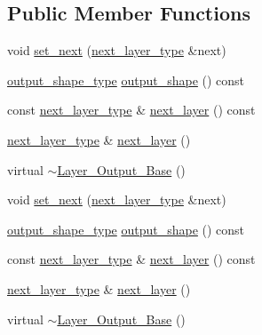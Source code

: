 \subsection*{Public Member Functions}
\begin{DoxyCompactItemize}
\item 
void \hyperlink{structbc_1_1nn_1_1Layer__Output__Base_a5a8d62346446d12d82153844b051e555}{set\+\_\+next} (\hyperlink{structbc_1_1nn_1_1Layer__Output__Base_a0c791bc57bcc78e8d82e8a5375f1c584}{next\+\_\+layer\+\_\+type} \&next)
\item 
\hyperlink{structbc_1_1nn_1_1Layer__Output__Base_aa627047014ee5dff2b9cc1804c791815}{output\+\_\+shape\+\_\+type} \hyperlink{structbc_1_1nn_1_1Layer__Output__Base_a68e2547ad75da9ef3a3410a9aec85a5e}{output\+\_\+shape} () const
\item 
const \hyperlink{structbc_1_1nn_1_1Layer__Output__Base_a0c791bc57bcc78e8d82e8a5375f1c584}{next\+\_\+layer\+\_\+type} \& \hyperlink{structbc_1_1nn_1_1Layer__Output__Base_a5f43dd4ad641db100b847d33843ef837}{next\+\_\+layer} () const
\item 
\hyperlink{structbc_1_1nn_1_1Layer__Output__Base_a0c791bc57bcc78e8d82e8a5375f1c584}{next\+\_\+layer\+\_\+type} \& \hyperlink{structbc_1_1nn_1_1Layer__Output__Base_a38b80aba3c1821fbef1f5525e282c36d}{next\+\_\+layer} ()
\item 
virtual \hyperlink{structbc_1_1nn_1_1Layer__Output__Base_a4ac27a579c01108c3ed2a7a95010382b}{$\sim$\+Layer\+\_\+\+Output\+\_\+\+Base} ()
\item 
void \hyperlink{structbc_1_1nn_1_1Layer__Output__Base_a5a8d62346446d12d82153844b051e555}{set\+\_\+next} (\hyperlink{structbc_1_1nn_1_1Layer__Output__Base_a0c791bc57bcc78e8d82e8a5375f1c584}{next\+\_\+layer\+\_\+type} \&next)
\item 
\hyperlink{structbc_1_1nn_1_1Layer__Output__Base_aa627047014ee5dff2b9cc1804c791815}{output\+\_\+shape\+\_\+type} \hyperlink{structbc_1_1nn_1_1Layer__Output__Base_a68e2547ad75da9ef3a3410a9aec85a5e}{output\+\_\+shape} () const
\item 
const \hyperlink{structbc_1_1nn_1_1Layer__Output__Base_a0c791bc57bcc78e8d82e8a5375f1c584}{next\+\_\+layer\+\_\+type} \& \hyperlink{structbc_1_1nn_1_1Layer__Output__Base_a5f43dd4ad641db100b847d33843ef837}{next\+\_\+layer} () const
\item 
\hyperlink{structbc_1_1nn_1_1Layer__Output__Base_a0c791bc57bcc78e8d82e8a5375f1c584}{next\+\_\+layer\+\_\+type} \& \hyperlink{structbc_1_1nn_1_1Layer__Output__Base_a38b80aba3c1821fbef1f5525e282c36d}{next\+\_\+layer} ()
\item 
virtual \hyperlink{structbc_1_1nn_1_1Layer__Output__Base_a4ac27a579c01108c3ed2a7a95010382b}{$\sim$\+Layer\+\_\+\+Output\+\_\+\+Base} ()
\end{DoxyCompactItemize}
